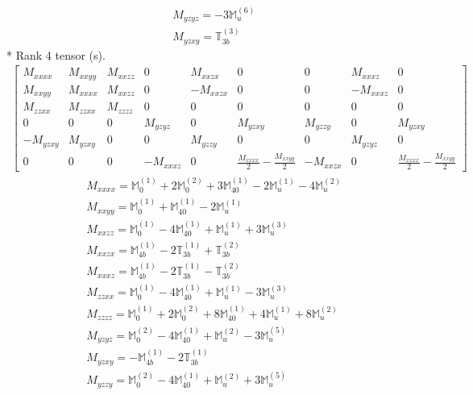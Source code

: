 \documentclass[fleqn,8pt,landscape]{jsarticle}
\begin{document}
\begin{align*}
& M_{yzyz} = - 3 \mathbb{M}_{u}^{(6)} \\
& M_{yzxy} = \mathbb{T}_{3b}^{(3)}
\end{align*}
* Rank 4 tensor (s).
\begin{align*}
\begin{bmatrix} M_{xxxx} & M_{xxyy} & M_{xxzz} & 0 & M_{xxzx} & 0 & 0 & M_{xxxz} & 0 \\ M_{xxyy} & M_{xxxx} & M_{xxzz} & 0 & - M_{xxzx} & 0 & 0 & - M_{xxxz} & 0 \\ M_{zzxx} & M_{zzxx} & M_{zzzz} & 0 & 0 & 0 & 0 & 0 & 0 \\ 0 & 0 & 0 & M_{yzyz} & 0 & M_{yzxy} & M_{yzzy} & 0 & M_{yzxy} \\ - M_{yzxy} & M_{yzxy} & 0 & 0 & M_{yzzy} & 0 & 0 & M_{yzyz} & 0 \\ 0 & 0 & 0 & - M_{xxxz} & 0 & \frac{M_{xxxx}}{2} - \frac{M_{xxyy}}{2} & - M_{xxzx} & 0 & \frac{M_{xxxx}}{2} - \frac{M_{xxyy}}{2} \end{bmatrix}
\end{align*}
\begin{align*}
& M_{xxxx} = \mathbb{M}_{0}^{(1)} + 2 \mathbb{M}_{0}^{(2)} + 3 \mathbb{M}_{40}^{(1)} - 2 \mathbb{M}_{u}^{(1)} - 4 \mathbb{M}_{u}^{(2)} \\
& M_{xxyy} = \mathbb{M}_{0}^{(1)} + \mathbb{M}_{40}^{(1)} - 2 \mathbb{M}_{u}^{(1)} \\
& M_{xxzz} = \mathbb{M}_{0}^{(1)} - 4 \mathbb{M}_{40}^{(1)} + \mathbb{M}_{u}^{(1)} + 3 \mathbb{M}_{u}^{(3)} \\
& M_{xxzx} = \mathbb{M}_{4b}^{(1)} - 2 \mathbb{T}_{3b}^{(1)} + \mathbb{T}_{3b}^{(2)} \\
& M_{xxxz} = \mathbb{M}_{4b}^{(1)} - 2 \mathbb{T}_{3b}^{(1)} - \mathbb{T}_{3b}^{(2)} \\
& M_{zzxx} = \mathbb{M}_{0}^{(1)} - 4 \mathbb{M}_{40}^{(1)} + \mathbb{M}_{u}^{(1)} - 3 \mathbb{M}_{u}^{(3)} \\
& M_{zzzz} = \mathbb{M}_{0}^{(1)} + 2 \mathbb{M}_{0}^{(2)} + 8 \mathbb{M}_{40}^{(1)} + 4 \mathbb{M}_{u}^{(1)} + 8 \mathbb{M}_{u}^{(2)} \\
& M_{yzyz} = \mathbb{M}_{0}^{(2)} - 4 \mathbb{M}_{40}^{(1)} + \mathbb{M}_{u}^{(2)} - 3 \mathbb{M}_{u}^{(5)} \\
& M_{yzxy} = - \mathbb{M}_{4b}^{(1)} - 2 \mathbb{T}_{3b}^{(1)} \\
& M_{yzzy} = \mathbb{M}_{0}^{(2)} - 4 \mathbb{M}_{40}^{(1)} + \mathbb{M}_{u}^{(2)} + 3 \mathbb{M}_{u}^{(5)}
\end{align*}
\end{document}
